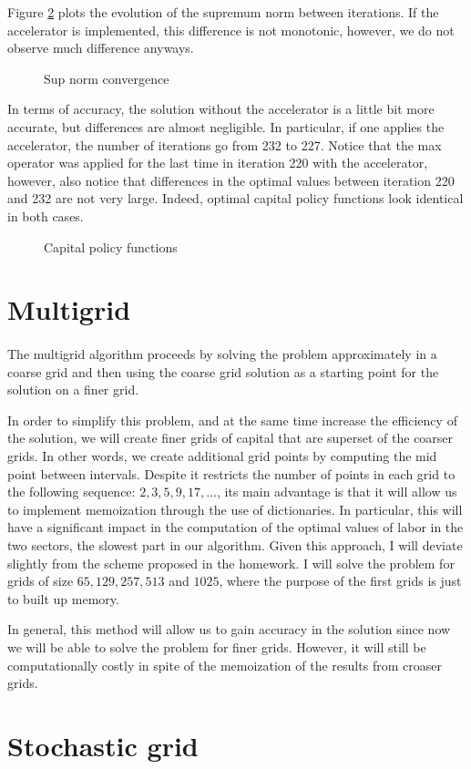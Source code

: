 \documentclass[11pt,a4paper]{article}
\newcommand{\goodgap}{ \hspace{\subfigtopskip} \hspace{\subfigbottomskip}}
\begin{document}
Figure \ref{VFI_convergence} plots the evolution of the supremum norm between iterations. If the accelerator is implemented, this difference is not monotonic, however, we do not observe much difference anyways. 
\begin{figure}[h]
\centering
{}
\goodgap
{}
\caption{Sup norm convergence}
\label{VFI_convergence}
\end{figure}

In terms of accuracy, the solution without the accelerator is a little bit more accurate, but differences are almost negligible. In particular, if one applies the accelerator, the number of iterations go from 232 to 227. Notice that the max operator was applied for the last time in iteration 220 with the accelerator, however, also notice that differences in the optimal values between iteration 220 and 232 are not very large. Indeed, optimal capital policy functions look identical in both cases. 

\vspace{0.5cm}\begin{figure}[h]
\centering
{}
\goodgap
{}
\caption{Capital policy functions}
\label{VFI_convergence}
\end{figure}

\section{Multigrid}
\paragraph{} The multigrid algorithm proceeds by solving the problem approximately in a coarse grid and then using the coarse grid solution as a starting point for the solution on a finer grid. 

In order to simplify this problem, and at the same time increase the efficiency of the solution, we will create finer grids of capital that are superset of the coarser grids. In other words, we create additional grid points by computing the mid point between intervals. Despite it restricts the number of points in each grid to the following sequence: $2,3,5,9,17,\dots$, its main advantage is that it will allow us to implement memoization through the use of dictionaries. In particular, this will have a significant impact in the computation of the optimal values of labor in the two sectors, the slowest part in our algorithm. Given this approach, I will deviate slightly from the scheme proposed in the homework. I will solve the problem for grids of size $65, 129, 257, 513$ and $1025$, where the purpose of the first grids is just to built up memory.  

In general, this method will allow us to gain accuracy in the solution since now we will be able to solve the problem for finer grids. However, it will still be computationally costly in spite of the memoization of the results from croaser grids. 

\section{Stochastic grid}
\end{document}
